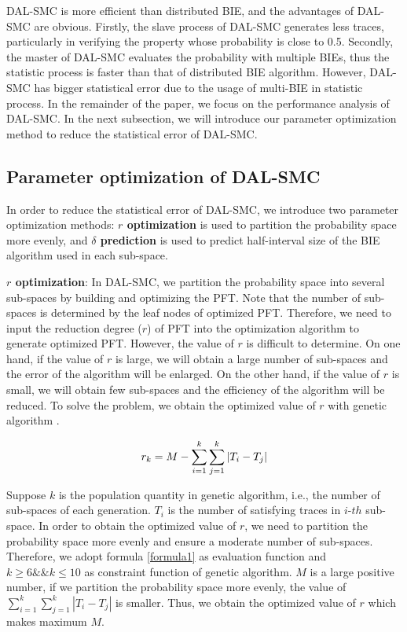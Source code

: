 DAL-SMC is more efficient than distributed BIE, and the advantages of DAL-SMC are obvious. Firstly, the slave process of DAL-SMC generates less traces, particularly in verifying the property whose probability is close to 0.5. Secondly, the master of DAL-SMC evaluates the probability with multiple BIEs, thus the statistic process is faster than that of distributed BIE algorithm. However, DAL-SMC has bigger statistical error due to the usage of multi-BIE in statistic process. In the remainder of the paper, we focus on the performance analysis of DAL-SMC.  In the next subsection, we will introduce our parameter optimization method to reduce the statistical error of DAL-SMC. 


\subsection{Parameter optimization of DAL-SMC}
In order to reduce the statistical error of DAL-SMC, we introduce two parameter optimization methods: \textbf{$r$ optimization} is used to partition the probability space more evenly, and \textbf{$\delta$ prediction} is used to predict half-interval size of the BIE algorithm used in each sub-space.

\textbf{$r$ optimization}: In DAL-SMC, we partition the probability space into several sub-spaces by building and optimizing the PFT. Note that the number of sub-spaces is determined by the leaf nodes of optimized PFT. Therefore, we need to input the reduction degree ($r$) of PFT into the optimization algorithm to generate optimized PFT. However, the value of $r$ is difficult to determine. On one hand, if the value of $r$ is large, we will obtain a large number of sub-spaces and the error of the algorithm will be enlarged. On the other hand, if the value of $r$ is small, we will obtain few sub-spaces and the efficiency of the algorithm will be reduced. To solve the problem, we obtain the optimized value of $r$ with genetic algorithm \cite{DBLP:books/daglib/0019871}. 

\begin{equation}
\centering
\label{formula1}
r_k = M - \sum\limits_{i=1}^k \sum\limits_{j=1}^k |T_i - T_j| 
\end{equation}

Suppose $k$ is the population quantity in genetic algorithm, i.e., the number of sub-spaces of each generation. $T_i$ is the number of satisfying traces in $i$-$th$ sub-space. In order to obtain the optimized value of $r$, we need to partition the probability space more evenly and ensure a moderate  number of sub-spaces. Therefore, we adopt formula \ref{formula1} as evaluation function and $k \geq 6 \&\& k \leq 10$ as constraint function of genetic algorithm. $M$ is a large positive number, if we partition the probability space more evenly, the value of $\sum\limits_{i=1}^k \sum\limits_{j=1}^k |T_i - T_j|$ is smaller. Thus, we obtain the optimized value of $r$ which makes maximum $M$. 

